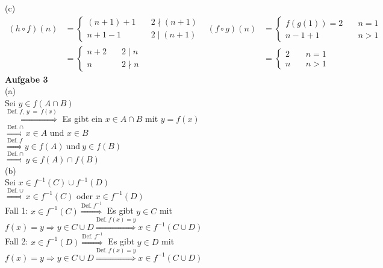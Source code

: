 \documentclass[a4paper, 12pt]{scrartcl}
\theoremstyle{plain}
\begin{document}
(c)
\begin{align*}
(h \circ f)(n) &= \begin{cases}(n+1)+1 &\quad 2  \nmid (n+1) \\ n+1-1 &\quad 2 \mid (n+1) \end{cases} & (f \circ g)(n) &= \begin{cases} f(g(1)) = 2 &\quad n = 1\\ n-1+1 &\quad n > 1\end{cases}\\
&= \begin{cases} n + 2 &\quad 2 \mid n\\n &\quad 2 \nmid n  \end{cases} & &= \begin{cases}2 &\quad n=1\\n &\quad n > 1\end{cases}
\end{align*}
\newpage
\textbf{Aufgabe 3}\\

\newcommand{\defimpl}[1]{\stackrel{\text{Def.}\;#1}{\Longrightarrow}}
(a)\\
Sei $y \in f(A \cap B)$\\
$\defimpl{f,\;y\;=\;f(x)}$ Es gibt ein $x \in A \cap B$ mit $y = f(x)$ \\	
$ \defimpl{\cap} x \in A$ und $x \in B$\\
$\stackrel{\text{Def.}\;f}{\Longrightarrow} y \in f(A)\ \text{und}\ y \in f(B)$\\
$ \defimpl{\cap} y \in f(A) \cap f(B)$ \\
(b)\\
Sei $x \in f^{-1}(C) \cup f^{-1}(D)$ \\
$\defimpl{\cup} x \in f^{-1}(C)$ oder $x \in f^{-1}(D)$ \\
Fall 1: $x \in f^{-1}(C) \defimpl{f^{-1}}$ Es gibt $y \in C$ mit $f(x) = y \Rightarrow y \in C \cup D \defimpl{f(x) = y} x \in f^{-1}(C \cup D)$ \\
Fall 2: $x \in f^{-1}(D) \defimpl{f^{-1}}$ Es gibt $y \in D$ mit $f(x) = y \Rightarrow y \in C \cup D \defimpl{f(x) = y} x \in f^{-1}(C \cup D)$
\end{document}
